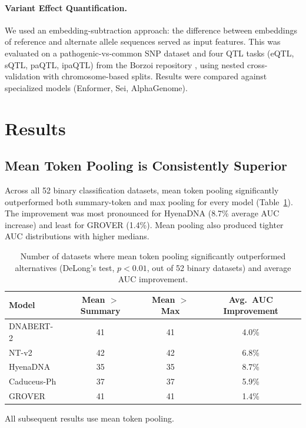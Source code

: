 \documentclass[11pt]{article}
\begin{document}
\paragraph{Variant Effect Quantification.} We used an embedding-subtraction approach: the difference between embeddings of reference and alternate allele sequences served as input features. This was evaluated on a pathogenic-vs-common SNP dataset and four QTL tasks (eQTL, sQTL, paQTL, ipaQTL) from the Borzoi repository \citep{linder2023borzoi}, using nested cross-validation with chromosome-based splits. Results were compared against specialized models (Enformer, Sei, AlphaGenome).

\section{Results}

\subsection{Mean Token Pooling is Consistently Superior}

Across all 52 binary classification datasets, mean token pooling significantly outperformed both summary-token and max pooling for every model (Table~\ref{tab:pooling}). The improvement was most pronounced for HyenaDNA (8.7\% average AUC increase) and least for GROVER (1.4\%). Mean pooling also produced tighter AUC distributions with higher medians.

\begin{table}[h]
\centering
\caption{Number of datasets where mean token pooling significantly outperformed alternatives (DeLong's test, $p < 0.01$, out of 52 binary datasets) and average AUC improvement.}
\label{tab:pooling}
\begin{tabular}{lccc}
\toprule
Model & Mean $>$ Summary & Mean $>$ Max & Avg.\ AUC Improvement \\
\midrule
DNABERT-2 & 41 & 41 & 4.0\% \\
NT-v2 & 42 & 42 & 6.8\% \\
HyenaDNA & 35 & 35 & 8.7\% \\
Caduceus-Ph & 37 & 37 & 5.9\% \\
GROVER & 41 & 41 & 1.4\% \\
\bottomrule
\end{tabular}
\end{table}

All subsequent results use mean token pooling.
\end{document}
